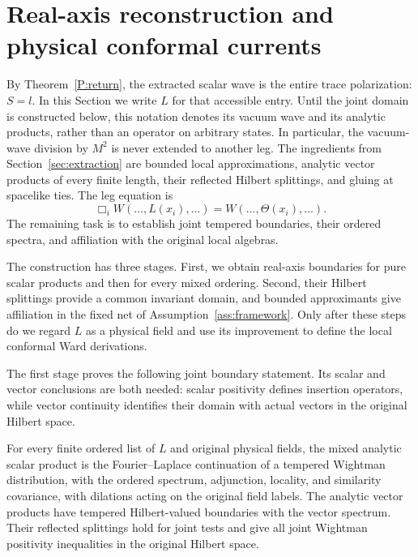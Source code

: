 \section{Real-axis reconstruction and physical conformal currents}
\label{sec:reconstruction}

By Theorem~\ref{P:return}, the extracted scalar wave is the entire
trace polarization: $S=l$.  In this Section we write $L$ for that accessible
entry.  Until the joint domain is constructed below, this notation denotes
its vacuum wave and its analytic products, rather than an operator on
arbitrary states.  In particular, the vacuum-wave division by $M^2$ is
never extended to another leg.  The ingredients from Section~\ref{sec:extraction} are
bounded local approximations, analytic vector products of every finite
length, their reflected Hilbert splittings, and gluing at spacelike ties.
The leg equation is
\begin{equation}\label{R:leg-equation}
 \Box_i W(\ldots,L(x_i),\ldots)
       =W(\ldots,\Theta(x_i),\ldots).
\end{equation}
The remaining task is to establish joint tempered boundaries, their
ordered spectra, and affiliation with the original local algebras.

The construction has three stages.  First, we obtain real-axis
boundaries for pure scalar products and then for every mixed ordering.
Second, their Hilbert splittings provide a common invariant domain,
and bounded approximants give affiliation in the fixed net of
Assumption~\ref{ass:framework}.  Only after these steps do we regard
$L$ as a physical field and use its improvement to define the local
conformal Ward derivations.

The first stage proves the following joint boundary statement.  Its
scalar and vector conclusions are both needed: scalar positivity
defines insertion operators, while vector continuity identifies their
domain with actual vectors in the original Hilbert space.

\begin{theorem}\label{R:mixed-products}
For every finite ordered list of $L$ and original physical fields,
the mixed analytic scalar product is the Fourier--Laplace continuation
of a tempered Wightman distribution, with the ordered spectrum,
adjunction, locality, and
similarity covariance, with dilations acting on the original field
labels.
The analytic vector products have tempered Hilbert-valued boundaries
with the vector spectrum.  Their reflected splittings hold for joint
tests and give all joint Wightman positivity inequalities in the
original Hilbert space.
\end{theorem}

